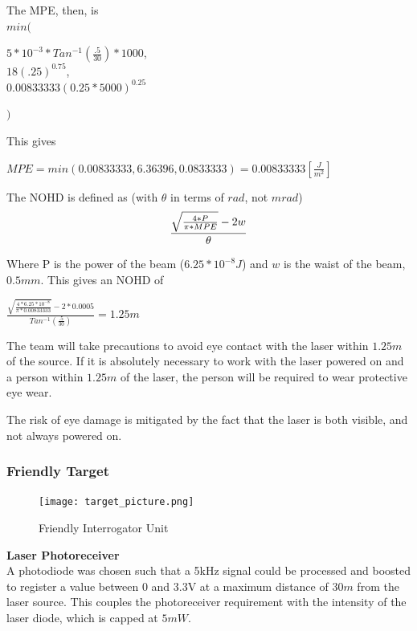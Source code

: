\documentclass[letterpaper,10pt]{article}
\begin{document}
\begin{spacing}{1.15}
 The MPE, then, is\\
 {\large $min($}
 \begin{center}
 	\large
 	 $5*10^{-3} * Tan^{-1}(\frac{.5}{30})* 1000$,\\
 	$18 (.25)^{0.75}$,\\
 	$0.00833333 (0.25*5000)^{0.25}$
 \end{center}
 {\large $)$}
 
 This gives 
 \begin{center}
 	\large
 	$MPE = min(0.00833333, 6.36396, 0.0833333) = 0.00833333 [\frac{J}{m^2}]$
 \end{center}
 
 The NOHD is defined as (with $\theta$ in terms of $rad$, not $mrad$)
 \begin{equation} \large
 	 \frac{\sqrt{\frac{4 * P}{\pi * MPE}} - 2w}{\theta}
 \end{equation}
 
 Where P is the power of the beam ($6.25*10^{-8} J$) and $w$ is the waist of the beam, $0.5mm$. This gives an NOHD of 
 \begin{center}
 	\large
 	$ \frac{\sqrt{\frac{4 * 6.25*10^{-8} }{\pi * 0.00833333}} - 2*0.0005}{Tan^{-1}(\frac{.5}{30})} = 1.25 m$
 \end{center}
 
 The team will take precautions to avoid eye contact with the laser within $1.25m$ of the source. If it is absolutely necessary to work with the laser powered on and a person within $1.25m$ of the laser, the person will be required to wear protective eye wear. 
 
 The risk of eye damage is mitigated by the fact that the laser is both visible, and not always powered on. 

\subsubsection{Friendly Target}


\begin{figure} [H]
	\centering
	\texttt{[image: target\_picture.png]}
	\caption{Friendly Interrogator Unit\label{fig:threshold}}
\end{figure}


\hspace{5mm}\textbf{Laser Photoreceiver} \label{section:laser-photoreceiver-design-procedure}\\
A photodiode was chosen such that a 5kHz signal could be processed and boosted to register a value between 0 and 3.3V at a maximum distance of $30m$ from the laser source. This couples the photoreceiver requirement with the intensity of the laser diode, which is capped at $5 mW$. 


\end{spacing}
\end{document}
